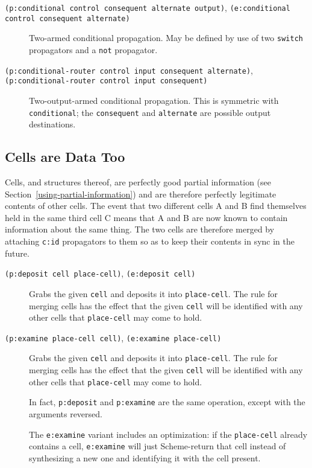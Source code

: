 \documentclass[12pt,letterpaper,english]{article}
\begin{document}
\begin{description}
\item[{\texttt{(p:conditional control consequent alternate output)}, \texttt{(e:conditional control consequent alternate)}}] \leavevmode 
Two-armed conditional propagation.  May be defined by use of two
\texttt{switch} propagators and a \texttt{not} propagator.

\item[{\texttt{(p:conditional-router control input consequent alternate)}, \texttt{(p:conditional-router control input consequent)}}] \leavevmode 
Two-output-armed conditional propagation.  This is symmetric with
\texttt{conditional}; the \texttt{consequent} and \texttt{alternate} are possible
output destinations.

\end{description}



\hypertarget{cells-are-data-too}{}
\subsection{Cells are Data Too}
\label{cells-are-data-too}

Cells, and structures thereof, are perfectly good partial information
(see Section~\ref{using-partial-information})
and are therefore perfectly legitimate contents of other
cells.  The event that two different cells A and B find themselves
held in the same third cell C means that A and B are now known to
contain information about the same thing.  The two cells are therefore
merged by attaching \texttt{c:id} propagators to them so as to keep their
contents in sync in the future.
\begin{description}
\item[{\texttt{(p:deposit cell place-cell)}, \texttt{(e:deposit cell)}}] \leavevmode 
Grabs the given \texttt{cell} and deposits it into \texttt{place-cell}.  The
rule for merging cells has the effect that the given \texttt{cell} will
be identified with any other cells that \texttt{place-cell} may come to
hold.

\item[{\texttt{(p:examine place-cell cell)}, \texttt{(e:examine place-cell)}}] \leavevmode 
Grabs the given \texttt{cell} and deposits it into \texttt{place-cell}.  The
rule for merging cells has the effect that the given \texttt{cell} will
be identified with any other cells that \texttt{place-cell} may come to
hold.

In fact, \texttt{p:deposit} and \texttt{p:examine} are the same operation,
except with the arguments reversed.

The \texttt{e:examine} variant includes an optimization: if the
\texttt{place-cell} already contains a cell, \texttt{e:examine} will just
Scheme-return that cell instead of synthesizing a new one and
identifying it with the cell present.

\end{description}
\end{document}
